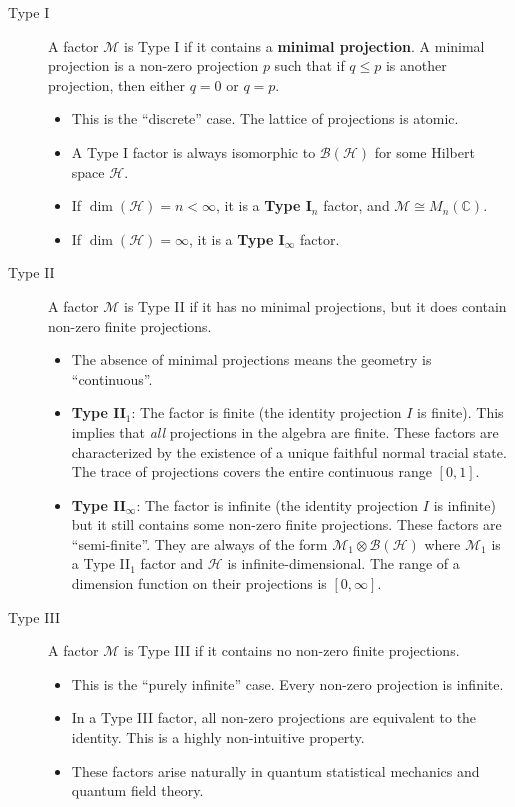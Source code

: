 \documentclass[11pt, a4paper]{article}
\theoremstyle{colored_def}
\theoremstyle{colored_thm}
\theoremstyle{colored_ex}
\newcommand{\C}{\mathbb{C}}
\newcommand{\M}{\mathcal{M}}
\newcommand{\Hil}{\mathcal{H}}
\newcommand{\B}{\mathcal{B}}
\begin{document}
\begin{description}
    \item[Type I] A factor $\M$ is Type I if it contains a \textbf{minimal projection}. A minimal projection is a non-zero projection $p$ such that if $q \leq p$ is another projection, then either $q=0$ or $q=p$.
    \begin{itemize}
        \item This is the ``discrete'' case. The lattice of projections is atomic.
        \item A Type I factor is always isomorphic to $\B(\Hil)$ for some Hilbert space $\Hil$.
        \item If $\dim(\Hil) = n < \infty$, it is a \textbf{Type I$_n$} factor, and $\M \cong M_n(\C)$.
        \item If $\dim(\Hil) = \infty$, it is a \textbf{Type I$_\infty$} factor.
    \end{itemize}

    \item[Type II] A factor $\M$ is Type II if it has no minimal projections, but it does contain non-zero finite projections.
    \begin{itemize}
        \item The absence of minimal projections means the geometry is ``continuous''.
        \item \textbf{Type II$_1$}: The factor is finite (the identity projection $I$ is finite). This implies that \textit{all} projections in the algebra are finite. These factors are characterized by the existence of a unique faithful normal tracial state. The trace of projections covers the entire continuous range $[0, 1]$.
        \item \textbf{Type II$_\infty$}: The factor is infinite (the identity projection $I$ is infinite) but it still contains some non-zero finite projections. These factors are ``semi-finite''. They are always of the form $\M_1 \otimes \B(\Hil)$ where $\M_1$ is a Type II$_1$ factor and $\Hil$ is infinite-dimensional. The range of a dimension function on their projections is $[0, \infty]$.
    \end{itemize}

    \item[Type III] A factor $\M$ is Type III if it contains no non-zero finite projections.
    \begin{itemize}
        \item This is the ``purely infinite'' case. Every non-zero projection is infinite.
        \item In a Type III factor, all non-zero projections are equivalent to the identity. This is a highly non-intuitive property.
        \item These factors arise naturally in quantum statistical mechanics and quantum field theory.
    \end{itemize}
\end{description}
\end{document}
